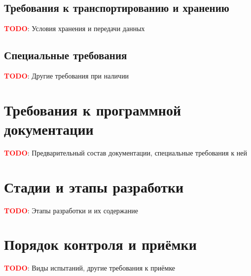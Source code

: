 \documentclass[12pt]{article}
\newcommand{\sectionBreaksTerse}{\vspace{1cm}}
\newcommand{\sectionBreaks}{\sectionBreaksTerse}
\let\origSection\section
\renewcommand{\section}{\sectionBreaks\origSection}
\newcommand{\todo}[1]{\textcolor{red}{\textbf{TODO}}: #1}
\begin{document}
    \subsection{Требования к транспортированию и хранению}
        \label{sec:req:data}
        \todo{Условия хранения и передачи данных}

    \subsection{Специальные требования}
        \label{sec:req:etc}
        \todo{Другие требования при наличии}

\section{Требования к программной документации}
    \label{sec:doc}
    \todo{Предварительный состав документации, специальные требования к ней}


\section{Стадии и этапы разработки}
    \label{sec:dev}
    \todo{Этапы разработки и их содержание}

\section{Порядок контроля и приёмки}
    \label{sec:test}
    \todo{Виды испытаний, другие требования к приёмке}
\end{document}
